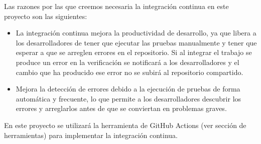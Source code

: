Las razones por las que creemos necesaria la integración continua en este proyecto son las siguientes:
\begin{itemize}
    \item La integración continua mejora la productividad de desarrollo, ya que libera a los desarrolladores de tener que ejecutar las pruebas manualmente y tener que esperar a que se arreglen errores en el repositorio. Si al integrar el trabajo se produce un error en la verificación se notificará a los desarrolladores y el cambio que ha producido ese error no se subirá al repositorio compartido.
    \item Mejora la detección de errores debido a la ejecución de pruebas de forma automática y frecuente, lo que permite a los desarrolladores descubrir los errores y arreglarlos antes de que se conviertan en problemas graves.
\end{itemize}

En este proyecto se utilizará la herramienta de GitHub Actions (ver sección de herramientas) para implementar la integración continua.
